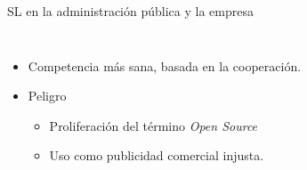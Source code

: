 \documentclass{beamer}
\begin{document}
\begin{frame}{SL en la administración pública y la empresa}
\begin{columns}
    \pause
    
    \begin{itemize}
    \item Competencia más sana, basada en la cooperación.
    \item \alert{Peligro} 
      \begin{itemize}
      \item Proliferación del término \emph{Open Source}
      \item Uso como publicidad comercial injusta.  
      \end{itemize}
    \end{itemize}
  \end{columns}

\end{frame}
\end{document}
